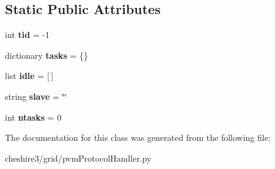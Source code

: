 \subsection*{Static Public Attributes}
\begin{DoxyCompactItemize}
\item 
\hypertarget{classcheshire3_1_1grid_1_1pvm_protocol_handler_1_1_task_manager_a5920a90d7e5b4d822c41b761c1047aa8}{int {\bfseries tid} = -\/1}\label{classcheshire3_1_1grid_1_1pvm_protocol_handler_1_1_task_manager_a5920a90d7e5b4d822c41b761c1047aa8}

\item 
\hypertarget{classcheshire3_1_1grid_1_1pvm_protocol_handler_1_1_task_manager_aa6b13f98cf7b3d88ae06096421c539c1}{dictionary {\bfseries tasks} = \{\}}\label{classcheshire3_1_1grid_1_1pvm_protocol_handler_1_1_task_manager_aa6b13f98cf7b3d88ae06096421c539c1}

\item 
\hypertarget{classcheshire3_1_1grid_1_1pvm_protocol_handler_1_1_task_manager_a09f303797bad61b851c76891eeddca24}{list {\bfseries idle} = \mbox{[}$\,$\mbox{]}}\label{classcheshire3_1_1grid_1_1pvm_protocol_handler_1_1_task_manager_a09f303797bad61b851c76891eeddca24}

\item 
\hypertarget{classcheshire3_1_1grid_1_1pvm_protocol_handler_1_1_task_manager_ab3fac7971131d4097457781386439534}{string {\bfseries slave} = \char`\"{}\char`\"{}}\label{classcheshire3_1_1grid_1_1pvm_protocol_handler_1_1_task_manager_ab3fac7971131d4097457781386439534}

\item 
\hypertarget{classcheshire3_1_1grid_1_1pvm_protocol_handler_1_1_task_manager_a8317a71f54a4a837f38d6404fc389343}{int {\bfseries ntasks} = 0}\label{classcheshire3_1_1grid_1_1pvm_protocol_handler_1_1_task_manager_a8317a71f54a4a837f38d6404fc389343}

\end{DoxyCompactItemize}


The documentation for this class was generated from the following file\-:\begin{DoxyCompactItemize}
\item 
cheshire3/grid/pvm\-Protocol\-Handler.\-py\end{DoxyCompactItemize}
